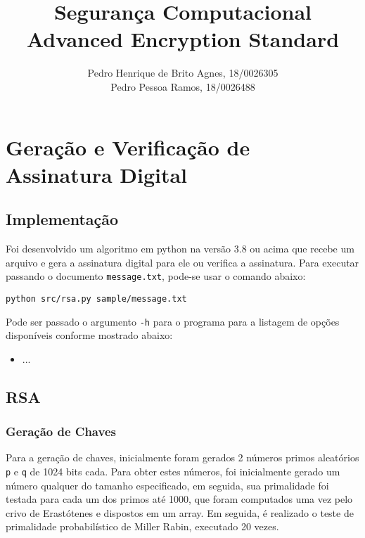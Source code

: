 \documentclass[12pt]{article}
\title{\textbf{Segurança Computacional\\ \Large{Advanced Encryption Standard}}}
\author{Pedro Henrique de Brito Agnes, 18/0026305
\\ Pedro Pessoa Ramos, 18/0026488
}
\affil{Dep. Ciência da Computação - Universidade de Brasília (UnB) \vspace{-2ex}}
\date{}
\begin{document}
\maketitle

\section{Geração e Verificação de Assinatura Digital}

\subsection{Implementação}
Foi desenvolvido um algoritmo em python na versão 3.8 ou acima que recebe um arquivo e gera a assinatura digital para ele ou verifica a assinatura. Para executar passando o documento \texttt{message.txt}, pode-se usar o comando abaixo:

\begin{lstlisting}
python src/rsa.py sample/message.txt
\end{lstlisting}

Pode ser passado o argumento \texttt{-h} para o programa para a listagem de opções disponíveis conforme mostrado abaixo:

\begin{itemize}
    \item ...
\end{itemize}

\subsection{RSA}
\subsubsection{Geração de Chaves}
Para a geração de chaves, inicialmente foram gerados 2 números primos aleatórios \texttt{p} e \texttt{q} de 1024 bits cada. Para obter estes números, foi inicialmente gerado um número qualquer do tamanho especificado, em seguida, sua primalidade foi testada para cada um dos primos até 1000, que foram computados uma vez pelo crivo de Erastótenes e dispostos em um array. Em seguida, é realizado o teste de primalidade probabilístico de Miller Rabin, executado 20 vezes. 
\end{document}
